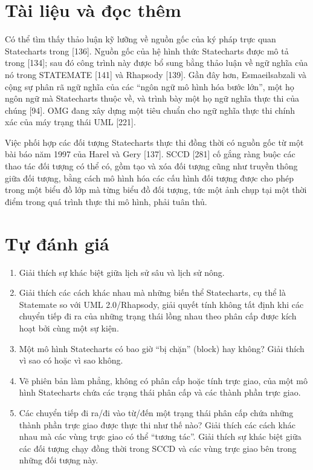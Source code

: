 \section{Tài liệu và đọc thêm}
Có thể tìm thấy thảo luận kỹ lưỡng về nguồn gốc của ký pháp trực quan Statecharts trong [136]. Nguồn gốc của hệ hình thức Statecharts được mô tả trong [134]; sau đó công trình này được bổ sung bằng thảo luận về ngữ nghĩa của nó trong STATEMATE [141] và Rhapsody [139]. Gần đây hơn, Esmaeilsabzali và cộng sự phân rã ngữ nghĩa của các ``ngôn ngữ mô hình hóa bước lớn'', một họ ngôn ngữ mà Statecharts thuộc về, và trình bày một họ ngữ nghĩa thực thi của chúng [94]. OMG đang xây dựng một tiêu chuẩn cho ngữ nghĩa thực thi chính xác của máy trạng thái UML [221].

Việc phối hợp các đối tượng Statecharts thực thi đồng thời có nguồn gốc từ một bài báo năm 1997 của Harel và Gery [137]. SCCD [281] cố gắng ràng buộc các thao tác đối tượng có thể có, gồm tạo và xóa đối tượng cũng như truyền thông giữa đối tượng, bằng cách mô hình hóa các cấu hình đối tượng được cho phép trong một biểu đồ lớp mà từng biểu đồ đối tượng, tức một ảnh chụp tại một thời điểm trong quá trình thực thi mô hình, phải tuân thủ.

\section{Tự đánh giá}
\begin{enumerate}
\item Giải thích sự khác biệt giữa lịch sử sâu và lịch sử nông.
\item Giải thích các cách khác nhau mà những biến thể Statecharts, cụ thể là Statemate so với UML 2.0/Rhapsody, giải quyết tính không tất định khi các chuyển tiếp đi ra của những trạng thái lồng nhau theo phân cấp được kích hoạt bởi cùng một sự kiện.
\item Một mô hình Statecharts có bao giờ ``bị chặn'' (block) hay không? Giải thích vì sao có hoặc vì sao không.
\item Vẽ phiên bản làm phẳng, không có phân cấp hoặc tính trực giao, của một mô hình Statecharts chứa các trạng thái phân cấp và các thành phần trực giao.
\item Các chuyển tiếp đi ra/đi vào từ/đến một trạng thái phân cấp chứa những thành phần trực giao được thực thi như thế nào? Giải thích các cách khác nhau mà các vùng trực giao có thể ``tương tác''. Giải thích sự khác biệt giữa các đối tượng chạy đồng thời trong SCCD và các vùng trực giao bên trong những đối tượng này.
\end{enumerate}

